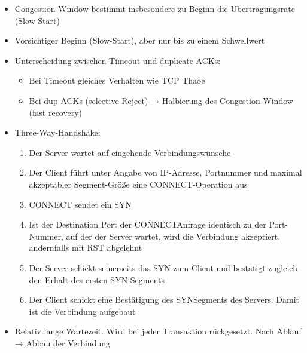 \begin{itemize}
    \item Congestion Window bestimmt insbesondere zu Beginn die Übertragungsrate (Slow Start)
\end{itemize}

\begin{itemize}
    \item Vorsichtiger Beginn (Slow-Start), aber nur bis zu einem Schwellwert
    \item Unterscheidung zwischen Timeout und duplicate ACKs:
    \begin{itemize}
        \item Bei Timeout gleiches Verhalten wie TCP Thaoe
        \item Bei dup-ACKs (selective Reject) → Halbierung des Congestion Window (fast recovery)
    \end{itemize}
\end{itemize}

\begin{itemize}
    \item Three-Way-Handshake:
    \begin{enumerate}
        \item Der Server wartet auf eingehende Verbindungswünsche
        \item Der Client führt unter Angabe von IP-Adresse, Portnummer und maximal akzeptabler Segment-Größe eine CONNECT-Operation aus
        \item CONNECT sendet ein SYN
        \item Ist der Destination Port der CONNECTAnfrage identisch zu der Port-Nummer, auf der der Server wartet, wird die Verbindung akzeptiert, andernfalls mit RST abgelehnt
        \item Der Server schickt seinerseits das SYN zum Client und bestätigt zugleich den Erhalt des ersten SYN-Segments
        \item Der Client schickt eine Bestätigung des SYNSegments des Servers.
        Damit ist die Verbindung aufgebaut
    \end{enumerate}
\end{itemize}

\begin{itemize}
    \item Relativ lange Wartezeit.
    Wird bei jeder Transaktion rückgesetzt.
    Nach Ablauf → Abbau der Verbindung
\end{itemize}

